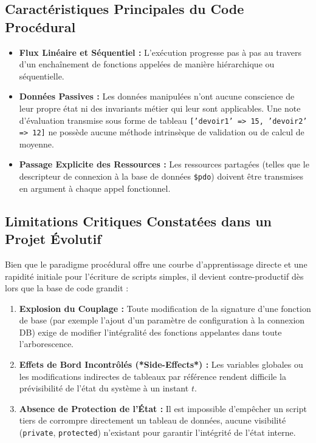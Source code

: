 \documentclass[11pt,a4paper,oneside]{report}
\begin{document}
\subsection{Caractéristiques Principales du Code Procédural}
\begin{itemize}[label=\textcolor{primaryMed}{\textbullet}]
    \item \textbf{Flux Linéaire et Séquentiel :} L'exécution progresse pas à pas au travers d'un enchaînement de fonctions appelées de manière hiérarchique ou séquentielle.
    \item \textbf{Données Passives :} Les données manipulées n'ont aucune conscience de leur propre état ni des invariants métier qui leur sont applicables. Une note d'évaluation transmise sous forme de tableau \texttt{['devoir1' => 15, 'devoir2' => 12]} ne possède aucune méthode intrinsèque de validation ou de calcul de moyenne.
    \item \textbf{Passage Explicite des Ressources :} Les ressources partagées (telles que le descripteur de connexion à la base de données \texttt{\$pdo}) doivent être transmises en argument à chaque appel fonctionnel.
\end{itemize}

\subsection{Limitations Critiques Constatées dans un Projet Évolutif}
Bien que le paradigme procédural offre une courbe d'apprentissage directe et une rapidité initiale pour l'écriture de scripts simples, il devient contre-productif dès lors que la base de code grandit :
\begin{enumerate}
    \item \textbf{Explosion du Couplage :} Toute modification de la signature d'une fonction de base (par exemple l'ajout d'un paramètre de configuration à la connexion DB) exige de modifier l'intégralité des fonctions appelantes dans toute l'arborescence.
    \item \textbf{Effets de Bord Incontrôlés (*Side-Effects*) :} Les variables globales ou les modifications indirectes de tableaux par référence rendent difficile la prévisibilité de l'état du système à un instant $t$.
    \item \textbf{Absence de Protection de l'État :} Il est impossible d'empêcher un script tiers de corrompre directement un tableau de données, aucune visibilité (\texttt{private}, \texttt{protected}) n'existant pour garantir l'intégrité de l'état interne.
\end{enumerate}
\end{document}
